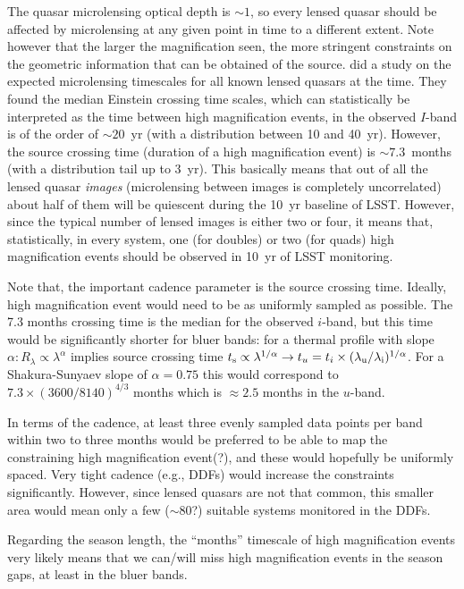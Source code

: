 The quasar microlensing optical depth is $\sim1$, so every lensed quasar should 
be affected by microlensing at any given point in time to a different extent. Note however that the larger the magnification seen, the more stringent constraints on the geometric information that can be obtained of the source. \citet{MosqueraandKochanek2011} did a study on the expected microlensing timescales for all known lensed quasars at the time. They found the median Einstein crossing time scales, which can statistically be interpreted as the time between high magnification events, in 
the observed $I$-band is of the order of $\sim20$~yr (with a distribution 
between 10 and 40~yr). However, the source crossing time (duration of a high 
magnification event) is $\sim7.3$~months (with a distribution tail up to 3~yr). 
This basically means that out of all the lensed quasar {\em images} 
(microlensing between images is completely uncorrelated) about half of them will 
be quiescent during the 10~yr baseline of LSST. However, since the typical 
number of lensed images is either two or four, it means that, statistically, in 
every system, one (for doubles) or two (for quads) high magnification events 
should be observed in 10~yr of LSST monitoring. 


Note that, the important cadence parameter is the source crossing time. Ideally, high magnification event would need to be as uniformly sampled as
possible. The 7.3 months crossing time is the median for the observed
$i$-band, but this time would be significantly shorter for bluer bands:
for a thermal profile with slope
$\alpha: R_\lambda \propto \lambda^\alpha$ implies source crossing time
$t_{\rm s} \propto \lambda^{1/\alpha} \rightarrow
t_u=t_i \times (\lambda_{\rm u} / \lambda_{\rm i})^{1/\alpha}$. For a
Shakura-Sunyaev slope of $\alpha=0.75$ this would correspond to
$7.3 \times (3600/8140)^{4/3}$ months which is $\approx 2.5$ months in
the $u$-band.


In terms of the cadence, at least three evenly sampled data points per
band within two to three months would be preferred to be able to map
the constraining high magnification event(?), and these would
hopefully be uniformly spaced. Very tight cadence (e.g., DDFs) would
increase the constraints significantly. However, since lensed quasars
are not that common, this smaller area would mean only a few
($\sim80$?) suitable systems monitored in the DDFs.

Regarding the season length, the ``months'' timescale of high
magnification events very likely means that we can/will miss high
magnification events in the season gaps, at least in the bluer bands.


